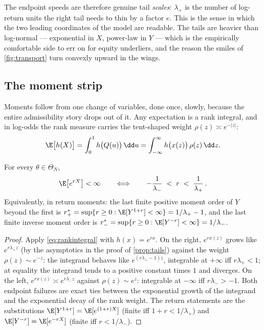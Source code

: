 The endpoint speeds are therefore genuine tail \emph{scales}: $\lambda_+$
is the number of log-return units the right tail needs to thin by a factor
$e$.  This is the sense in which the two leading coordinates of the model
are readable.  The tails are heavier than log-normal --- exponential in
$X$, power-law in $Y$ --- which is the empirically comfortable side to err
on for equity underliers, and the reason the smiles of
\cref{fig:transport} turn convexly upward in the wings.

\subsection{The moment strip}

Moments follow from one change of variables, done once, slowly, because the
entire admissibility story drops out of it.  Any expectation is a rank
integral, and in log-odds the rank measure carries the tent-shaped weight
$\rho(z)\asymp e^{-|z|}$:
\begin{equation}
\E\big[h(X)\big]
=\int_0^1 h\big(Q(u)\big)\,\dd u
=\int_{-\infty}^{\infty}h\big(x(z)\big)\,\rho(z)\,\dd z .
\label{eq:rankintegral}
\end{equation}

\begin{proposition}
\label{prop:strip}
For every $\theta\in\Theta_N$,
\begin{equation}
\E\big[e^{rX}\big]<\infty
\qquad\Longleftrightarrow\qquad
-\frac{1}{\lambda_-}\;<\;r\;<\;\frac{1}{\lambda_+}\,.
\label{eq:strip}
\end{equation}
Equivalently, in return moments: the last finite positive moment order of
$Y$ beyond the first is $r_+^{*}=\sup\{r\ge0:\E[Y^{1+r}]<\infty\}
=1/\lambda_+-1$, and the last finite inverse moment order is
$r_-^{*}=\sup\{r\ge0:\E[Y^{-r}]<\infty\}=1/\lambda_-$.
\end{proposition}

\begin{proof}
Apply \eqref{eq:rankintegral} with $h(x)=e^{rx}$.  On the right,
$e^{rx(z)}$ grows like $e^{r\lambda_+z}$ (by the asymptotics in the proof
of \cref{prop:tails}) against the weight $\rho(z)\sim e^{-z}$: the
integrand behaves like $e^{(r\lambda_+-1)z}$, integrable at $+\infty$ iff
$r\lambda_+<1$; at equality the integrand tends to a positive constant
times $1$ and diverges.  On the left, $e^{rx(z)}\asymp e^{r\lambda_-z}$
against $\rho(z)\sim e^{z}$: integrable at $-\infty$ iff $r\lambda_->-1$.
Both endpoint failures are exact ties between the exponential growth of
the integrand and the exponential decay of the rank weight.  The return
statements are the substitutions $\E[Y^{1+r}]=\E[e^{(1+r)X}]$ (finite iff
$1+r<1/\lambda_+$) and $\E[Y^{-r}]=\E[e^{-rX}]$ (finite iff
$r<1/\lambda_-$).
\end{proof}

